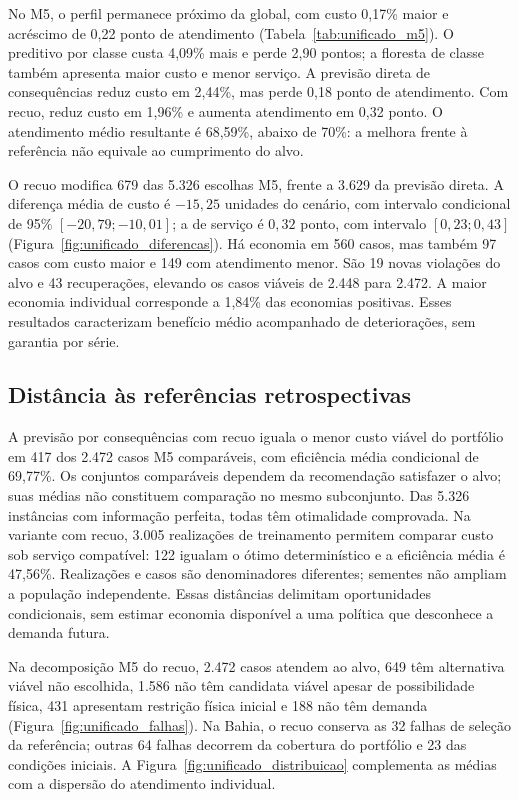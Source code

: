 \documentclass[preprint,12pt]{elsarticle}
\begin{document}
No M5, o perfil permanece próximo da global, com custo 0,17\% maior e acréscimo de 0,22 ponto de atendimento (Tabela~\ref{tab:unificado_m5}). O preditivo por classe custa 4,09\% mais e perde 2,90 pontos; a floresta de classe também apresenta maior custo e menor serviço. A previsão direta de consequências reduz custo em 2,44\%, mas perde 0,18 ponto de atendimento. Com recuo, reduz custo em 1,96\% e aumenta atendimento em 0,32 ponto. O atendimento médio resultante é 68,59\%, abaixo de 70\%: a melhora frente à referência não equivale ao cumprimento do alvo.

O recuo modifica 679 das 5.326 escolhas M5, frente a 3.629 da previsão direta. A diferença média de custo é $-15{,}25$ unidades do cenário, com intervalo condicional de 95\% $[-20{,}79;-10{,}01]$; a de serviço é $0{,}32$ ponto, com intervalo $[0{,}23;0{,}43]$ (Figura~\ref{fig:unificado_diferencas}). Há economia em 560 casos, mas também 97 casos com custo maior e 149 com atendimento menor. São 19 novas violações do alvo e 43 recuperações, elevando os casos viáveis de 2.448 para 2.472. A maior economia individual corresponde a 1,84\% das economias positivas. Esses resultados caracterizam benefício médio acompanhado de deteriorações, sem garantia por série.

\subsection{Distância às referências retrospectivas}
A previsão por consequências com recuo iguala o menor custo viável do portfólio em 417 dos 2.472 casos M5 comparáveis, com eficiência média condicional de 69,77\%. Os conjuntos comparáveis dependem da recomendação satisfazer o alvo; suas médias não constituem comparação no mesmo subconjunto. Das 5.326 instâncias com informação perfeita, todas têm otimalidade comprovada. Na variante com recuo, 3.005 realizações de treinamento permitem comparar custo sob serviço compatível: 122 igualam o ótimo determinístico e a eficiência média é 47,56\%. Realizações e casos são denominadores diferentes; sementes não ampliam a população independente. Essas distâncias delimitam oportunidades condicionais, sem estimar economia disponível a uma política que desconhece a demanda futura.

Na decomposição M5 do recuo, 2.472 casos atendem ao alvo, 649 têm alternativa viável não escolhida, 1.586 não têm candidata viável apesar de possibilidade física, 431 apresentam restrição física inicial e 188 não têm demanda (Figura~\ref{fig:unificado_falhas}). Na Bahia, o recuo conserva as 32 falhas de seleção da referência; outras 64 falhas decorrem da cobertura do portfólio e 23 das condições iniciais. A Figura~\ref{fig:unificado_distribuicao} complementa as médias com a dispersão do atendimento individual.
\end{document}
